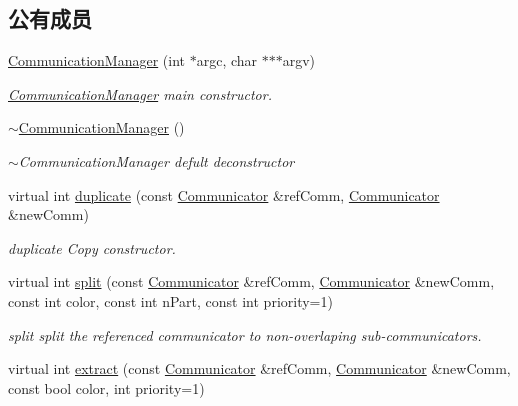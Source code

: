 \subsection*{公有成员}
\begin{DoxyCompactItemize}
\item 
\hyperlink{classHSF_1_1CommunicationManager_a2323f6f52600227b24cf9e5419565206}{CommunicationManager} (int $\ast$argc, char $\ast$$\ast$$\ast$argv)
\begin{DoxyCompactList}\small\item\em \hyperlink{classHSF_1_1CommunicationManager}{CommunicationManager} main constructor. \item\end{DoxyCompactList}\item 
\hyperlink{classHSF_1_1CommunicationManager_ab98fc8b313467c85105bad87a7195cd8}{$\sim$CommunicationManager} ()
\begin{DoxyCompactList}\small\item\em $\sim$CommunicationManager defult deconstructor \item\end{DoxyCompactList}\item 
virtual int \hyperlink{classHSF_1_1CommunicationManager_aa2afb95a55e1e33429cbb118b0abadf3}{duplicate} (const \hyperlink{classHSF_1_1Communicator}{Communicator} \&refComm, \hyperlink{classHSF_1_1Communicator}{Communicator} \&newComm)
\begin{DoxyCompactList}\small\item\em duplicate Copy constructor. \item\end{DoxyCompactList}\item 
virtual int \hyperlink{classHSF_1_1CommunicationManager_ac7894dbdde04977f11fdbe954641d28e}{split} (const \hyperlink{classHSF_1_1Communicator}{Communicator} \&refComm, \hyperlink{classHSF_1_1Communicator}{Communicator} \&newComm, const int color, const int nPart, const int priority=1)
\begin{DoxyCompactList}\small\item\em split split the referenced communicator to non-\/overlaping sub-\/communicators. \item\end{DoxyCompactList}\item 
virtual int \hyperlink{classHSF_1_1CommunicationManager_ac9867c3a68d13f2f9cfd54393d8c06ad}{extract} (const \hyperlink{classHSF_1_1Communicator}{Communicator} \&refComm, \hyperlink{classHSF_1_1Communicator}{Communicator} \&newComm, const bool color, int priority=1)

\end{DoxyCompactItemize}
